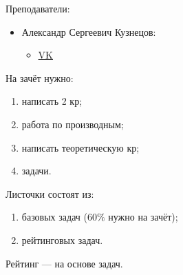\documentclass[12pt,a4paper]{article}
\begin{document}
    Преподаватели:
    \begin{itemize}
        \item Александр Сергеевич Кузнецов:
            \begin{itemize}
                \item \href{https://vk.com/ak_mcn}{VK}
            \end{itemize}
    \end{itemize}

    На зачёт нужно:
    \begin{enumerate}
        \item написать 2 кр;
        \item работа по производным;
        \item написать теоретическую кр;
        \item задачи.
    \end{enumerate}

    Листочки состоят из:
    \begin{enumerate}
        \item базовых задач ($60\%$ нужно на зачёт);
        \item рейтинговых задач.
    \end{enumerate}

    Рейтинг --- на основе задач.
\end{document}
